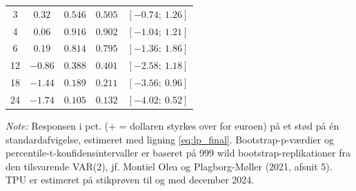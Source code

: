 \begin{table}[H]
\begin{threeparttable}
\begin{tabular}{c cccc}
3 & $0.32$ & $0.546$ & $0.505$ & $[-0.74;\ 1.26]$ \\
4 & $0.06$ & $0.916$ & $0.902$ & $[-1.04;\ 1.21]$ \\
6 & $0.19$ & $0.814$ & $0.795$ & $[-1.36;\ 1.86]$ \\
12 & $-0.86$ & $0.388$ & $0.401$ & $[-2.58;\ 1.18]$ \\
18 & $-1.44$ & $0.189$ & $0.211$ & $[-3.56;\ 0.96]$ \\
24 & $-1.74$ & $0.105$ & $0.132$ & $[-4.02;\ 0.52]$ \\
\bottomrule
\end{tabular}
\begin{tablenotes}[flushleft]\footnotesize
\item \textit{Note:} Responsen i pct. (+ = dollaren styrkes over for euroen) på et stød på
én standardafvigelse, estimeret med ligning \eqref{eq:lp_final}. Bootstrap-p-værdier og
percentile-t-konfidensintervaller er baseret på 999 wild bootstrap-replikationer fra den
tilsvarende VAR(2), jf. Montiel Olea og Plagborg-Møller (2021, afsnit 5). TPU er estimeret
på stikprøven til og med december 2024.
\end{tablenotes}
\end{threeparttable}
\end{table}